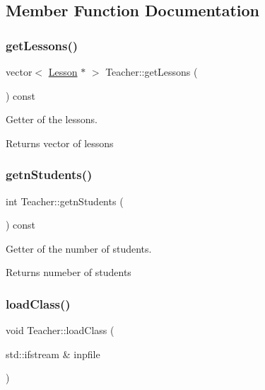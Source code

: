 \subsection{Member Function Documentation}
\mbox{\label{class_teacher_ab81c1d9f42a315f11d91a8247a943612}} 
\subsubsection{\texorpdfstring{get\+Lessons()}{getLessons()}}
{\footnotesize\ttfamily vector$<$ \mbox{\hyperlink{class_lesson}{Lesson}} $\ast$ $>$ Teacher\+::get\+Lessons (\begin{DoxyParamCaption}{ }\end{DoxyParamCaption}) const}



Getter of the lessons. 

\begin{DoxyReturn}{Returns}
vector of lessons 
\end{DoxyReturn}
\mbox{\label{class_teacher_a430db21f5ff329759302fbd35b6c365c}} 
\subsubsection{\texorpdfstring{getn\+Students()}{getnStudents()}}
{\footnotesize\ttfamily int Teacher\+::getn\+Students (\begin{DoxyParamCaption}{ }\end{DoxyParamCaption}) const}



Getter of the number of students. 

\begin{DoxyReturn}{Returns}
numeber of students 
\end{DoxyReturn}
\mbox{\label{class_teacher_a1f204644af41c43ff3bd0582393062fa}} 
\subsubsection{\texorpdfstring{load\+Class()}{loadClass()}}
{\footnotesize\ttfamily void Teacher\+::load\+Class (\begin{DoxyParamCaption}\item[{std\+::ifstream \&}]{inpfile }\end{DoxyParamCaption})\hspace{0.3cm}{\ttfamily [virtual]}}



